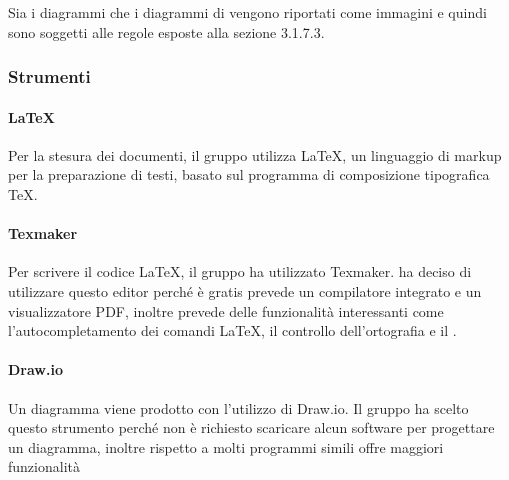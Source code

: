 Sia i diagrammi  che i diagrammi di  vengono riportati come immagini e quindi sono soggetti alle regole esposte alla sezione 3.1.7.3.

\subsubsection{Strumenti}
\paragraph{\LaTeX{}}
Per la stesura dei documenti, il gruppo utilizza \LaTeX{}, un linguaggio di markup per la preparazione di testi, basato sul programma di composizione tipografica \TeX{}.

\paragraph{Texmaker}
Per scrivere il codice \LaTeX{}, il gruppo ha utilizzato Texmaker. \Gruppo{} ha deciso di utilizzare questo editor perché è gratis prevede un compilatore integrato e un visualizzatore PDF, inoltre prevede delle funzionalità interessanti come l'autocompletamento dei comandi \LaTeX{}, il controllo dell'ortografia e il .

\paragraph{Draw.io}
Un diagramma  viene prodotto con l'utilizzo di Draw.io. Il gruppo ha scelto questo strumento perché non è richiesto scaricare alcun software per progettare un diagramma, inoltre rispetto a molti programmi simili offre maggiori funzionalità









